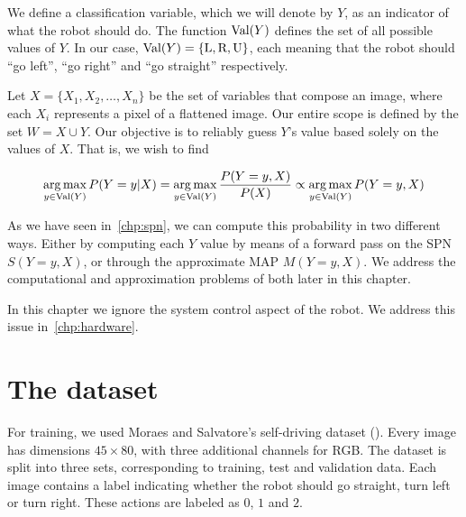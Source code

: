 We define a classification variable, which we will denote by $Y$, as an indicator of what the robot
should do. The function $\operatorname*{\text{Val}}(Y)$ defines the set of all possible values of $Y$. In our case,
$\operatorname*{\text{Val}}(Y)=\{\text{L},\text{R}, \text{U}\}$, each meaning that the robot should ``go left'', ``go right'' and
``go straight'' respectively.

Let $X=\{X_1,X_2,\ldots,X_n\}$ be the set of variables that compose an image, where each $X_i$
represents a pixel of a flattened image. Our entire scope is defined by the set $W=X\cup Y$. Our
objective is to reliably guess $Y$'s value based solely on the values of $X$. That is, we wish to
find

\begin{equation*}
  \operatorname*{arg\,max}_{y\in\operatorname*{\text{Val}}(Y)} P(Y=y|X) = \operatorname*{arg\,max}_{y\in\operatorname*{\text{Val}}(Y)} \frac{P(Y=y,X)}{P(X)}\propto
  \operatorname*{arg\,max}_{y\in\operatorname*{\text{Val}}(Y)} P(Y=y,X)
\end{equation*}

As we have seen in~\autoref{chp:spn}, we can compute this probability in two different ways. Either
by computing each $Y$ value by means of a forward pass on the SPN $S(Y=y,X)$, or through the
approximate MAP $M(Y=y,X)$. We address the computational and approximation problems of both later
in this chapter.

In this chapter we ignore the system control aspect of the robot. We address this issue
in~\autoref{chp:hardware}.

\section{The dataset}

For training, we used Moraes and Salvatore's self-driving dataset (\cite{self-driving}). Every
image has dimensions $45\times 80$, with three additional channels for RGB. The dataset is split
into three sets, corresponding to training, test and validation data. Each image contains a label
indicating whether the robot should go straight, turn left or turn right. These actions are labeled
as $0$, $1$ and $2$.

